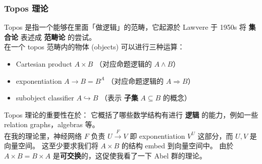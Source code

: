 \documentclass[15pt]{beamer}
\newcommand{\cc}[2]{#1}
\newcommand{\cc}[2]{#2}
\newcommand{\emp}[1]{{\color{violet}#1}}
\newcommand{\red}[1]{{\color{red}#1}}
\begin{document}
\begin{frame}
\frametitle{\cc{Topos 理论}{Topos theory}}

\cc{
Topos 是指一个能够在里面「\red{做逻辑}」的范畴，它起源於 Lawvere 于 1950s 将 \textbf{集合论} 表述成 \textbf{范畴论} 的尝试。 \\}{
A topos is a category in which one can ``\red{do logic}''.  The idea originated in 1950's when Lawvere tried to re-formulate the foundation of mathematics / \emp{set theory} in the new language of \emp{category theory}. \\
}
\cc{
在一个 topos 范畴内的物体 (objects) 可以进行三种运算：}{
In a topos, 3 operations are allowed between objects:
}
\begin{itemize}
	\item Cartesian product $A \times B$ \cc{
	（对应命题逻辑的 $A \wedge B$）}{
	(corresponding to $A \wedge B$ in propositional logic)
	}
	\item exponentiation $A \rightarrow B = B^A$ \cc{
	 （对应命题逻辑的 $A \Rightarrow B$）}{
	(corresponding to $A \Rightarrow B$ in propositional logic)
	}
	\item subobject classifier $A \hookrightarrow B$  \cc{
	（表示 \textbf{子集} $A \subseteq B$ 的概念）}{
	(corresponding to the subset notion $A \subseteq B$)
	}
\end{itemize}
\cc{
Topos 理论的重要性在於： 它概括了哪些数学结构有进行 \textbf{逻辑} 的能力，例如一些 relation graphs，algebras 等。 \\}{
The significance of topos theory is that it distills which mathematical structures are able to carry on \emp{logic} operations, e.g. relation graphs, algebras, etc. \\
}
\cc{
在我的理论里，神经网络 $F$ 负责 $U \stackrel{F}{\rightarrow} V$ 即 exponentiation $V^U$ 这部分，而 $U, V$ 是向量空间。 这至少要求我们将 $A \times B$ 的结构 embed 到向量空间中。 由於 $A \times B = B \times A$ 是\textbf{可交换}的，这促使我看了一下 Abel 群的理论。}{
In my theory, the neural network $F$ implements $U \stackrel{F}{\rightarrow} V$ which is the exponentiation $V^U$, where $U, V$ are vector spaces.  This requires, at least, to embed the structure of $A \times B$ into vector space.  However $A \times B = B \times A$ is \emp{commutative}, which led me to consider Abelian group theory....
}
\end{frame}
\end{document}
